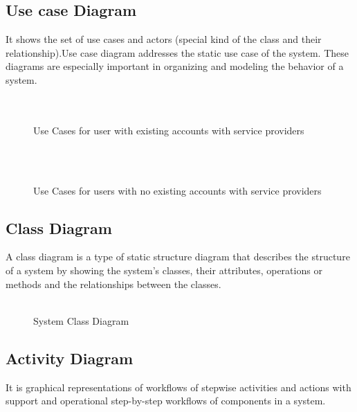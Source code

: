 \documentclass{SureshLimkar}
\begin{document}
\subsection{Use case Diagram}
 It shows the set of use cases and actors (special kind of the class and their relationship).Use case diagram addresses the static use case of the system. These diagrams are especially important in organizing and modeling the behavior of a system. \\ \\ \\

\begin{figure}[h]%
\centering
{}%
\caption{Use Cases for user with existing accounts with service providers}%
\label{Use Cases for the user with existing accounts}%
\end{figure}
\\
\\
\begin{figure}[h]%
\centering
{}%
\caption{Use Cases for users with no existing accounts with service providers}%
\label{Use Cases for the System}%
\end{figure}

\newpage

\subsection{Class Diagram}
A class diagram is a type of static structure diagram that describes the structure of a system by showing the system’s classes, their attributes, operations or methods and the relationships between the classes. \\ \\ 
\begin{figure}[h]%
\centering
{}%
\caption{System Class Diagram}%
\label{System Class Diagram}%
\end{figure}

\newpage

\subsection{Activity Diagram }
It is  graphical representations of workflows of stepwise activities and actions with support and operational step-by-step workflows of components in a system.\\ \\ \\
\end{document}
